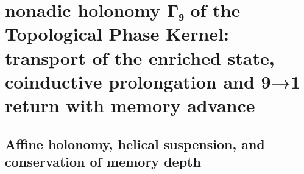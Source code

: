 \chapter{nonadic holonomy Γ₉ of the Topological Phase Kernel: transport of the enriched state, coinductive prolongation and 9→1 return with memory advance}
\label{chap:sucesor-102-08}
\label{owner:sucesor-102-20-arquitectura-desarrollo-holonomico}
\label{owner:sucesor-102-u008-u010-unicos}

\begin{HMTScientificOwnerSubordinated}
\let\HMTLabelBeforeOwnerSixD\label
\renewcommand{\label}[1]{%
  \ifstrequal{#1}{thm:eje-espejo-nonadico}%
    {\HMTLabelBeforeOwnerSixD{owner06d:thm:eje-espejo-nonadico}}%
    {\HMTLabelBeforeOwnerSixD{#1}}%
}

\end{HMTScientificOwnerSubordinated}


\section{Affine holonomy, helical suspension, and conservation of memory depth}
\begin{HMTSpiralIntegratedBody}

\end{HMTSpiralIntegratedBody}












